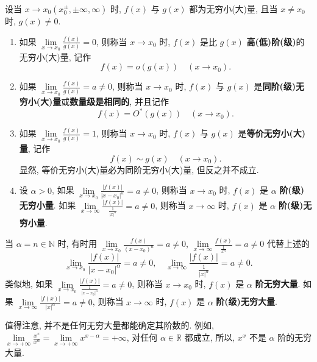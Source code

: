 \begin{definition}\label{def:2.3.2}
设当 $x \to x_0(x_0^{\pm}, \pm\infty, \infty)$ 时, $f(x)$ 与 $g(x)$ 都为无穷小(大)量, 且当 $x \neq x_0$ 时, $g(x) \neq 0$.
\begin{enumerate}[label=(\arabic*)]
  \item 如果 $\lim\limits_{x\to x_0}\frac{f(x)}{g(x)} = 0$, 则称当 $x \to x_0$ 时, $f(x)$ 是比 $g(x)$ \textbf{高(低)阶(级)}的无穷小(大)量, 记作
  \[
  f(x) = o(g(x))\quad (x \to x_0).
\]
  \item 如果 $\lim\limits_{x\to x_0}\frac{f(x)}{g(x)} = a \neq 0$, 则称当 $x \to x_0$ 时, $f(x)$ 与 $g(x)$ 是\textbf{同阶(级)无穷小(大)量}或\textbf{数量级是相同的}, 并且记作
  \[
  f(x) = O^*(g(x))\quad (x \to x_0).
\]
  \item 如果 $\lim\limits_{x\to x_0}\frac{f(x)}{g(x)} = 1$, 则称当 $x \to x_0$ 时, $f(x)$ 与 $g(x)$ 是\textbf{等价无穷小(大)量}, 记作
  \[
  f(x) \sim g(x)\quad (x \to x_0).
\]
  显然, 等价无穷小(大)量必为同阶无穷小(大)量, 但反之并不成立.
  \item 设 $\alpha > 0$, 如果 $\lim\limits_{x\to x_0}\frac{|f(x)|}{|x - x_0|^\alpha} = a \neq 0$, 则称当 $x \to x_0$ 时, $f(x)$ 是 $\alpha$ \textbf{阶(级)无穷小量}. 如果 $\lim\limits_{x\to\infty}\frac{|f(x)|}{\frac{1}{|x|^\alpha}} = a \neq 0$, 则称当 $x \to \infty$ 时, $f(x)$ 是 $\alpha$ \textbf{阶(级)无穷小量}.
\end{enumerate}

当 $\alpha = n \in \mathbb{N}$ 时, 有时用 $\lim\limits_{x\to x_0}\frac{f(x)}{(x - x_0)^n} = a \neq 0$, $\lim\limits_{x\to\infty}\frac{f(x)}{\frac{1}{x^n}} = a \neq 0$ 代替上述的
\[
\lim_{x\to x_0}\frac{|f(x)|}{|x - x_0|^\alpha} = a \neq 0,\quad \lim_{x\to\infty}\frac{|f(x)|}{\frac{1}{|x|^\alpha}} = a \neq 0.
\]
类似地, 如果 $\lim\limits_{x\to x_0}\frac{|f(x)|}{\frac{1}{|x - x_0|^\alpha}} = a \neq 0$, 则称当 $x \to x_0$ 时, $f(x)$ 是 $\alpha$ \textbf{阶无穷大量}. 如果 $\lim\limits_{x\to\infty}\frac{|f(x)|}{|x|^\alpha} = a \neq 0$, 则称当 $x \to \infty$ 时, $f(x)$ 是 $\alpha$ \textbf{阶(级)无穷大量}.

值得注意, 并不是任何无穷大量都能确定其阶数的. 例如, $\lim\limits_{x\to+\infty}\frac{x^x}{x^\alpha} = \lim\limits_{x\to+\infty} x^{x-\alpha} = +\infty$, 对任何 $\alpha \in \mathbb{R}$ 都成立, 所以, $x^x$ 不是 $\alpha$ 阶的无穷大量.
\end{definition}

